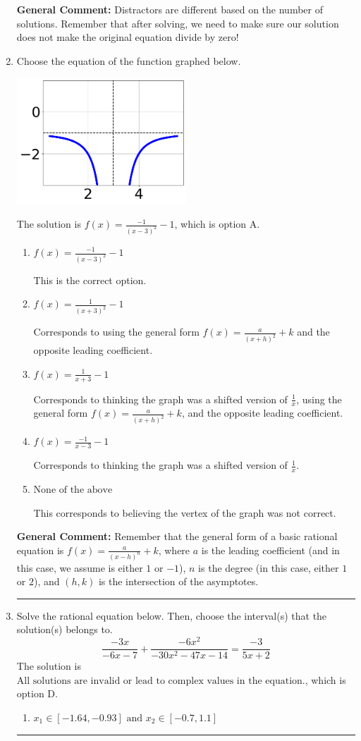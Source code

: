 \documentclass{extbook}[14pt]
\newcommand{\litem}[1]{\item #1

\rule{\textwidth}{0.4pt}}
\begin{document}
\begin{enumerate}
{\textbf{General Comment:} Distractors are different based on the number of solutions. Remember that after solving, we need to make sure our solution does not make the original equation divide by zero!
}
\litem{
Choose the equation of the function graphed below.

\begin{center}
    \includegraphics[width=0.5\textwidth]{../Figures/rationalGraphToEquationA.png}
\end{center}


The solution is \( f(x) = \frac{-1}{(x - 3)^2} - 1 \), which is option A.\begin{enumerate}[label=\Alph*.]
\item \( f(x) = \frac{-1}{(x - 3)^2} - 1 \)

This is the correct option.
\item \( f(x) = \frac{1}{(x + 3)^2} - 1 \)

Corresponds to using the general form $f(x) = \frac{a}{(x+h)^2}+k$ and the opposite leading coefficient.
\item \( f(x) = \frac{1}{x + 3} - 1 \)

Corresponds to thinking the graph was a shifted version of $\frac{1}{x}$, using the general form $f(x) = \frac{a}{(x+h)^2}+k$, and the opposite leading coefficient.
\item \( f(x) = \frac{-1}{x - 3} - 1 \)

Corresponds to thinking the graph was a shifted version of $\frac{1}{x}$.
\item \( \text{None of the above} \)

This corresponds to believing the vertex of the graph was not correct.
\end{enumerate}

\textbf{General Comment:} Remember that the general form of a basic rational equation is $ f(x) = \frac{a}{(x-h)^n} + k$, where $a$ is the leading coefficient (and in this case, we assume is either $1$ or $-1$), $n$ is the degree (in this case, either $1$ or $2$), and $(h, k)$ is the intersection of the asymptotes.
}
\litem{
Solve the rational equation below. Then, choose the interval(s) that the solution(s) belongs to.
\[ \frac{-3x}{-6x -7} + \frac{-6x^{2}}{-30x^{2} -47 x -14} = \frac{-3}{5x + 2} \]The solution is \( \text{All solutions are invalid or lead to complex values in the equation.} \), which is option D.\begin{enumerate}[label=\Alph*.]
\item \( x_1 \in [-1.64, -0.93] \text{ and } x_2 \in [-0.7,1.1] \)


\end{enumerate}}
\end{enumerate}
\end{document}
